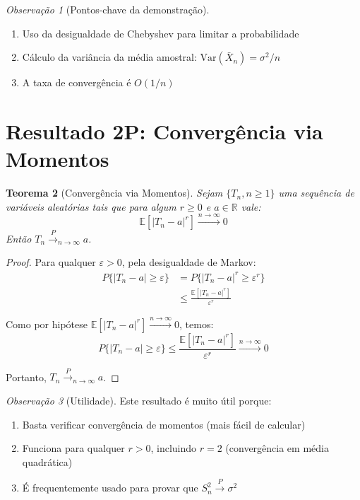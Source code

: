 \documentclass[12pt,a4paper]{article}
\theoremstyle{plain}
\newtheorem{teorema}{Teorema}[section]
\theoremstyle{definition}
\theoremstyle{remark}
\newtheorem{observacao}[teorema]{Observação}
\begin{document}
\begin{observacao}[Pontos-chave da demonstração]
\begin{enumerate}
    \item Uso da desigualdade de Chebyshev para limitar a probabilidade
    \item Cálculo da variância da média amostral: $\mathrm{Var}(\bar{X}_n) = \sigma^2/n$
    \item A taxa de convergência é $O(1/n)$
\end{enumerate}
\end{observacao}

\section{Resultado 2P: Convergência via Momentos}

\begin{teorema}[Convergência via Momentos]
Sejam $\{T_n, n \geq 1\}$ uma sequência de variáveis aleatórias tais que para algum $r \geq 0$ e $a \in \mathbb{R}$ vale:
\[
\mathbb{E}\left[|T_n - a|^r\right] \xrightarrow{n \to \infty} 0
\]
Então $T_n \xrightarrow{P}_{n \to \infty} a$.
\end{teorema}

\begin{proof}
Para qualquer $\varepsilon > 0$, pela desigualdade de Markov:
\begin{align}
P\{|T_n - a| \geq \varepsilon\} &= P\{|T_n - a|^r \geq \varepsilon^r\} \\
&\leq \frac{\mathbb{E}[|T_n - a|^r]}{\varepsilon^r}
\end{align}

Como por hipótese $\mathbb{E}[|T_n - a|^r] \xrightarrow{n \to \infty} 0$, temos:
\[
P\{|T_n - a| \geq \varepsilon\} \leq \frac{\mathbb{E}[|T_n - a|^r]}{\varepsilon^r} \xrightarrow{n \to \infty} 0
\]

Portanto, $T_n \xrightarrow{P}_{n \to \infty} a$.
\end{proof}

\begin{observacao}[Utilidade]
Este resultado é muito útil porque:
\begin{enumerate}
    \item Basta verificar convergência de momentos (mais fácil de calcular)
    \item Funciona para qualquer $r > 0$, incluindo $r = 2$ (convergência em média quadrática)
    \item É frequentemente usado para provar que $S_n^2 \xrightarrow{P} \sigma^2$
\end{enumerate}
\end{observacao}
\end{document}

